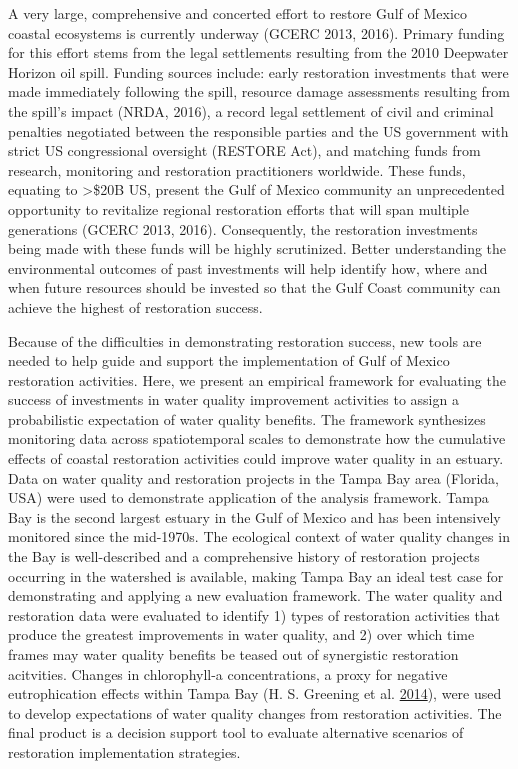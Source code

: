 \documentclass[]{article}
\begin{document}
A very large, comprehensive and concerted effort to restore Gulf of
Mexico coastal ecosystems is currently underway (GCERC 2013, 2016).
Primary funding for this effort stems from the legal settlements
resulting from the 2010 Deepwater Horizon oil spill. Funding sources
include: early restoration investments that were made immediately
following the spill, resource damage assessments resulting from the
spill's impact (NRDA, 2016), a record legal settlement of civil and
criminal penalties negotiated between the responsible parties and the US
government with strict US congressional oversight (RESTORE Act), and
matching funds from research, monitoring and restoration practitioners
worldwide. These funds, equating to \textgreater{}\$20B US, present the
Gulf of Mexico community an unprecedented opportunity to revitalize
regional restoration efforts that will span multiple generations (GCERC
2013, 2016). Consequently, the restoration investments being made with
these funds will be highly scrutinized. Better understanding the
environmental outcomes of past investments will help identify how, where
and when future resources should be invested so that the Gulf Coast
community can achieve the highest of restoration success.

Because of the difficulties in demonstrating restoration success, new
tools are needed to help guide and support the implementation of Gulf of
Mexico restoration activities. Here, we present an empirical framework
for evaluating the success of investments in water quality improvement
activities to assign a probabilistic expectation of water quality
benefits. The framework synthesizes monitoring data across
spatiotemporal scales to demonstrate how the cumulative effects of
coastal restoration activities could improve water quality in an
estuary. Data on water quality and restoration projects in the Tampa Bay
area (Florida, USA) were used to demonstrate application of the analysis
framework. Tampa Bay is the second largest estuary in the Gulf of Mexico
and has been intensively monitored since the mid-1970s. The ecological
context of water quality changes in the Bay is well-described and a
comprehensive history of restoration projects occurring in the watershed
is available, making Tampa Bay an ideal test case for demonstrating and
applying a new evaluation framework. The water quality and restoration
data were evaluated to identify 1) types of restoration activities that
produce the greatest improvements in water quality, and 2) over which
time frames may water quality benefits be teased out of synergistic
restoration acitvities. Changes in chlorophyll-a concentrations, a proxy
for negative eutrophication effects within Tampa Bay (H. S. Greening et
al. \protect\hyperlink{ref-Greening2014}{2014}), were used to develop
expectations of water quality changes from restoration activities. The
final product is a decision support tool to evaluate alternative
scenarios of restoration implementation strategies.
\end{document}
